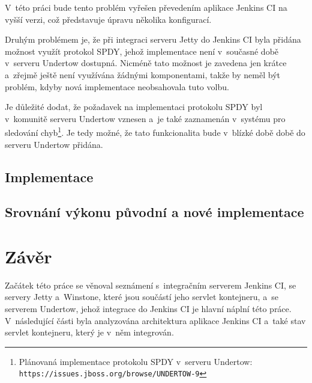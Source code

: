             V~této práci bude tento problém vyřešen převedením aplikace Jenkins CI na vyšší verzi,
            což představuje úpravu několika konfigurací.

            \medskip        
            Druhým problémem je, že při integraci serveru Jetty do Jenkins CI byla přidána
            možnost využít protokol SPDY, jehož implementace
            není v~současné době v~serveru Undertow dostupná. Nicméně tato možnost
            je zavedena jen krátce a~zřejmě ještě není využívána žádnými komponentami,
            takže by neměl být problém, kdyby nová implementace neobsahovala tuto volbu.
            
            Je důležité dodat, že požadavek na implementaci 
            protokolu SPDY byl v~komunitě serveru Undertow vznesen
            a~je také zaznamenán v~systému pro sledování chyb\footnote{
                Plánovaná implementace protokolu SPDY v~serveru Undertow:
                \texttt{https://issues.jboss.org/browse/UNDERTOW-9}}.
            Je tedy možné, že tato funkcionalita bude v~blízké době době do serveru
            Undertow přidána.
            



    \section{Implementace}

    \section{Srovnání výkonu původní a nové implementace}  \label{kapPerformance}




\chapter{Závěr}
    Začátek této práce se věnoval seznámení s~integračním serverem Jenkins CI,
    se servery Jetty a~Winstone, které jsou součástí jeho servlet kontejneru,
    a~se serverem Undertow, jehož integrace do Jenkins CI je hlavní
    náplní této práce. V~následující části byla analyzována architektura aplikace Jenkins CI
    a~také stav servlet kontejneru, který je v~něm integrován.

